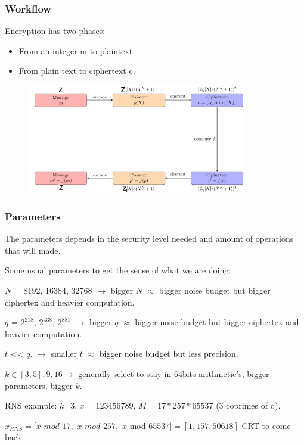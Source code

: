 \documentclass[10pt,handout]{beamer}
\begin{document}
\begin{frame}[noframenumbering]
\frametitle{Workflow}

    Encryption has two phases:
\begin{itemize}
    \item From an integer m to plaintext
    \item From plain text to ciphertext c.
\end{itemize}


\begin{figure}
    \includegraphics[width=0.85\textwidth]{bfv-diagram.png}
\end{figure}


\end{frame}

\begin{frame}[noframenumbering]

\frametitle{Parameters}

The parameters depends in the security level needed and amount of operations that will made.

\vspace{-0.2cm}

Some usual parameters to get the sense of what we are doing:
\vspace{-0.2cm}

$N$ = 8192, 16384, 32768 $\rightarrow$ bigger $N$ $\approx$ bigger noise budget but bigger ciphertex and heavier computation.
\vspace{-0.2cm}

    $q$ = $2^{218}$,   $2^{438}$,  $2^{881}$ $\rightarrow$ bigger $q$ $\approx$ bigger noise budget but bigger ciphertex and heavier computation.
\vspace{-0.2cm}

    $t$  << $q$. $\rightarrow$ smaller $t$ $\approx$ bigger noise budget but less precision.

\vspace{-0.2cm}
    $k\in [3,5], 9, 16 \rightarrow$ generally select to stay in 64bits arithmetic's, bigger parameters, bigger $k$.


\vspace{-0.2cm}
    RNS example: $k$=3, $x=123456789$, $M = 17 * 257 * 65537$ (3 coprimes of q).

\vspace{-0.2cm}
    $x_{RNS} = [x$ $mod$ $17,$ $x$ $mod$ $257,$ $x$ mod $ 65537] = [1, 157, 50618]$ CRT to come back
\end{frame}
\end{document}
